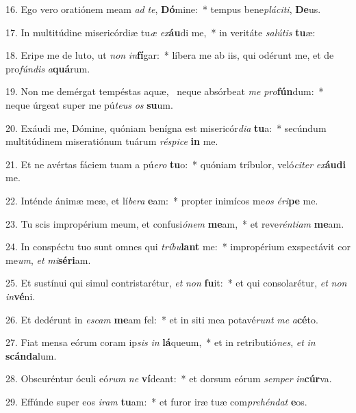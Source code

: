 16. Ego vero oratiónem meam \textit{ad} \textit{te}, \textbf{Dó}mine:~*  tempus bene\textit{plá}\textit{ci}\textit{ti}, \textbf{De}us.\

17. In multitúdine misericórdiæ tu\textit{æ} \textit{ex}\textbf{áu}di me,~*  in veritáte \textit{sa}\textit{lú}\textit{tis} \textbf{tu}æ:\

18. Eripe me de luto, ut \textit{non} \textit{in}\textbf{fí}gar:~*  líbera me ab iis, qui odérunt me, et de pro\textit{fún}\textit{dis} \textit{a}\textbf{quá}rum.\

19. Non me demérgat tempéstas aquæ, \dag\  neque absórbeat \textit{me} \textit{pro}\textbf{fún}dum:~*  neque úrgeat super me pú\textit{te}\textit{us} \textit{os} \textbf{su}um.\

20. Exáudi me, Dómine, quóniam benígna est misericór\textit{di}\textit{a} \textbf{tu}a:~*  secúndum multitúdinem miseratiónum tuárum \textit{ré}\textit{spi}\textit{ce} \textbf{in} me.\

21. Et ne avértas fáciem tuam a pú\textit{e}\textit{ro} \textbf{tu}o:~*  quóniam tríbulor, veló\textit{ci}\textit{ter} \textit{ex}\textbf{áu}\textbf{di} me.\

22. Inténde ánimæ meæ, et lí\textit{be}\textit{ra} \textbf{e}am:~*  propter inimícos me\textit{os} \textit{é}\textit{ri}\textbf{pe} me.\

23. Tu scis impropérium meum, et confusi\textit{ó}\textit{nem} \textbf{me}am,~*  et reve\textit{rén}\textit{ti}\textit{am} \textbf{me}am.\

24. In conspéctu tuo sunt omnes qui \textit{trí}\textit{bu}\textbf{lant} me:~*  impropérium exspectávit cor me\textit{um}, \textit{et} \textit{mi}\textbf{sé}\textbf{ri}am.\

25. Et sustínui qui simul contristarétur, \textit{et} \textit{non} \textbf{fu}it:~*  et qui consolarétur, \textit{et} \textit{non} \textit{in}\textbf{vé}ni.\

26. Et dedérunt in \textit{es}\textit{cam} \textbf{me}am fel:~*  et in siti mea potavé\textit{runt} \textit{me} \textit{a}\textbf{cé}to.\

27. Fiat mensa eórum coram ip\textit{sis} \textit{in} \textbf{lá}queum,~*  et in retributió\textit{nes}, \textit{et} \textit{in} \textbf{scán}\textbf{da}lum.\

28. Obscuréntur óculi eó\textit{rum} \textit{ne} \textbf{ví}deant:~*  et dorsum eórum \textit{sem}\textit{per} \textit{in}\textbf{cúr}va.\

29. Effúnde super eos \textit{i}\textit{ram} \textbf{tu}am:~*  et furor iræ tuæ com\textit{pre}\textit{hén}\textit{dat} \textbf{e}os.\

